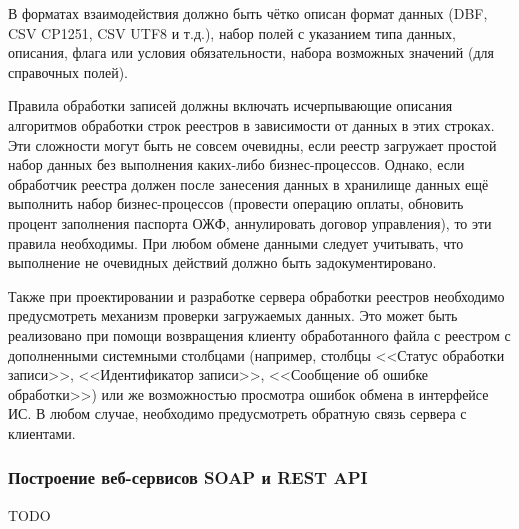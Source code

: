 В форматах взаимодействия должно быть чётко описан формат данных (DBF, CSV CP1251, CSV UTF8 и т.д.), набор полей с указанием типа данных, описания, флага или условия обязательности, набора возможных значений (для справочных полей).

Правила обработки записей должны включать исчерпывающие описания алгоритмов обработки строк реестров в зависимости от данных в этих строках.
Эти сложности могут быть не совсем очевидны, если реестр загружает простой набор данных без выполнения каких-либо бизнес-процессов.
Однако, если обработчик реестра должен после занесения данных в хранилище данных ещё выполнить набор бизнес-процессов (провести операцию оплаты, обновить процент заполнения паспорта ОЖФ, аннулировать договор управления), то эти правила необходимы.
При любом обмене данными следует учитывать, что выполнение не очевидных действий должно быть задокументировано.

Также при проектировании и разработке сервера обработки реестров необходимо предусмотреть механизм проверки загружаемых данных.
Это может быть реализовано при помощи возвращения клиенту обработанного файла с реестром с дополненными системными столбцами (например, столбцы <<Статус обработки записи>>, <<Идентификатор записи>>, <<Сообщение об ошибке обработки>>) или же возможностью просмотра ошибок обмена в интерфейсе ИС.
В любом случае, необходимо предусмотреть обратную связь сервера с клиентами.

\subsubsection{Построение веб-сервисов SOAP и REST API}

TODO

\clearpage
\newpage